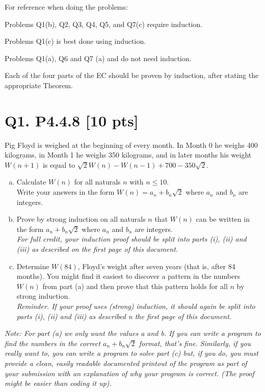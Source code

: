 \documentclass[12pt]{article}
\begin{document}
For reference when doing the problems:


Problems Q1(b), Q2, Q3, Q4, Q5, and Q7(c)  require induction.


Problems Q1(c)  is best done using induction.


Problems  Q1(a), Q6 and Q7 (a) and  do not need induction.

Each of the four parts of the EC should be proven by induction, after stating the appropriate Theorem.
\newpage

\section*{\textbf{Q1. P4.4.8} [10 pts]}
 Pig Floyd is weighed at the beginning of every month. In Month 0 he weighs 400 kilograms, in Month 1 he weighs 350 kilograms, and in later months his weight $W(n + 1)$ is equal to $\sqrt{2}W(n) - W(n - 1) + 700 - 350 \sqrt{2}$.
\begin{enumerate}[(a)]
    \item  Calculate $W(n)$ for all naturals $n$ with $n \leq 10.$\\ Write your answers in the form $W(n) = a_n + b_n \sqrt{2}$ where $a_n$ and $b_n$ are integers.
    
    \item  Prove by strong induction on all naturals $n$ that $W(n)$ can be written in the form $a_n + b_n \sqrt{2}$ where $a_n$ and $b_n$ are integers.\\
    {\em \small For full credit, your induction  proof should be split into parts (i), (ii) and (iii) as described on the first page of this document.}


    \item  Determine $W(84)$, Floyd’s weight after seven years (that is, after 84 months). You might  find it easiest to discover a pattern in the numbers $W(n)$ from part (a)  and then prove that this pattern holds for all $n$ by strong induction. \\
    {\em \small Reminder. If your proof uses  (strong) induction, it should again be split into parts  (i), (ii) and (iii) as described n the first page of this document.}
    
\end{enumerate}

\textit{Note: For part (a) we only want the values a and b.  If you can write a program to find the numbers in the correct $a_n + b_n \sqrt 2$ format, that's fine. Similarly, if you really want to, you can write a program to solve part (c) but, if you do, you must provide a clean, easily readable documented printout of the program as part of your submission with an explanation of why your program is correct. (The proof might be easier than coding it up).
}
\end{document}
